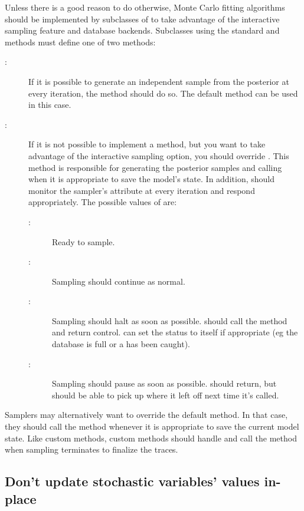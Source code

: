 \documentclass[]{jss}
\begin{document}
Unless there is a good reason to do otherwise, Monte Carlo fitting algorithms should be implemented by subclasses of  to take advantage of the interactive sampling feature and database backends. Subclasses using the standard  and  methods must define one of two methods:
\begin{description}
   \item[:] If it is possible to generate an independent sample from the posterior at every iteration, the  method should do so. The default  method can be used in this case.
   \item[:] If it is not possible to implement a  method, but you want to take advantage of the interactive sampling option, you should override . This method is responsible for generating the posterior samples and calling  when it is appropriate to save the model's state. In addition,  should monitor the sampler's  attribute at every iteration and respond appropriately. The possible values of  are:
   \begin{description}
      \item[:] Ready to sample.
      \item[:] Sampling should continue as normal.
      \item[:] Sampling should halt as soon as possible.  should call the  method and return control.  can set the status to  itself if appropriate (eg the database is full or a  has been caught).
      \item[:] Sampling should pause as soon as possible.  should return, but should be able to pick up where it left off next time it's called.
   \end{description}
\end{description}

Samplers may alternatively want to override the default  method. In that case, they should call the  method whenever it is appropriate to save the current model state. Like custom  methods, custom  methods should handle  and call the  method when sampling terminates to finalize the traces.


\subsection{Don't update stochastic variables' values in-place}
\label{dont-update-indepth}
\end{document}
